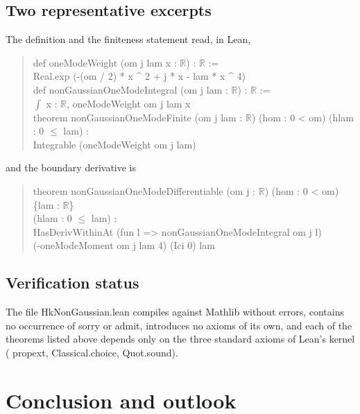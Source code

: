 \documentclass[11pt,a4paper]{article}
\theoremstyle{plain}
\theoremstyle{definition}
\theoremstyle{remark}
\let\leanoldunderscore\_
\newcommand{\leanbreakunderscore}{\leanoldunderscore\allowbreak}
\newcommand{\lean}[1]{{\ttfamily\hyphenchar\font=-1\relax
  \let\_\leanbreakunderscore #1}}
\begin{document}
\subsection{Two representative excerpts}

The definition and the finiteness statement read, in Lean,
\begin{quote}\footnotesize\ttfamily
def oneModeWeight (om j lam x : $\mathbb{R}$) : $\mathbb{R}$ :=\\
\hspace*{2em}Real.exp (-(om / 2) * x \textasciicircum{} 2 + j * x - lam * x \textasciicircum{} 4)\\[1mm]
def nonGaussianOneModeIntegral (om j lam : $\mathbb{R}$) : $\mathbb{R}$ :=\\
\hspace*{2em}$\int$ x : $\mathbb{R}$, oneModeWeight om j lam x\\[1mm]
theorem nonGaussianOneModeFinite (om j lam : $\mathbb{R}$) (hom : 0 < om) (hlam : 0 $\le$ lam) :\\
\hspace*{2em}Integrable (oneModeWeight om j lam)
\end{quote}
and the boundary derivative is
\begin{quote}\footnotesize\ttfamily
theorem nonGaussianOneModeDifferentiable (om j : $\mathbb{R}$) (hom : 0 < om) \{lam : $\mathbb{R}$\}\\
\hspace*{2em}(hlam : 0 $\le$ lam) :\\
\hspace*{2em}HasDerivWithinAt (fun l => nonGaussianOneModeIntegral om j l)\\
\hspace*{4em}(-oneModeMoment om j lam 4) (Ici 0) lam
\end{quote}

\subsection{Verification status}

The file \lean{HkNonGaussian.lean} compiles against Mathlib without errors, contains no
occurrence of \lean{sorry} or \lean{admit}, introduces no axioms of its own, and each of
the theorems listed above depends only on the three standard axioms of Lean's kernel
(\lean{propext}, \lean{Classical.choice}, \lean{Quot.sound}).

\section{Conclusion and outlook}
\label{sec:conclusion}
\end{document}

